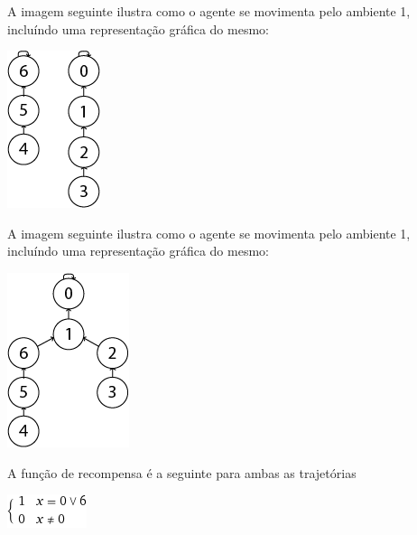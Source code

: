 \documentclass[11pt,twocolumn]{article}
\begin{document}
A imagem seguinte ilustra como o agente se movimenta pelo ambiente 1, incluíndo uma representação gráfica do mesmo:

\begin{center}
    \includegraphics[scale=0.4]{Trajetoria1.png}
\end{center}

\par A imagem seguinte ilustra como o agente se movimenta pelo ambiente 1, incluíndo uma representação gráfica do mesmo:



\begin{center}
    \includegraphics[scale=0.4]{Trajetoria2.png}
\end{center}

A função de recompensa é a seguinte para ambas as trajetórias 

\begin{center}
    \includegraphics[scale=0.6]{piece1.png}
\end{center}
\end{document}
